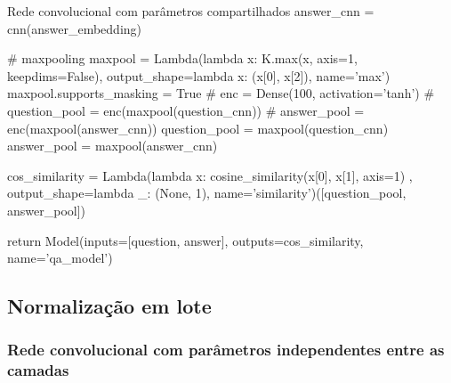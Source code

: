 \begin{mypython-linenumber}{Rede convolucional com parâmetros compartilhados}
            answer_cnn = cnn(answer_embedding)

        # maxpooling
        maxpool = Lambda(lambda x: K.max(x, axis=1, keepdims=False), output_shape=lambda x: (x[0], x[2]),
                         name='max')
        maxpool.supports_masking = True
        # enc = Dense(100, activation='tanh')
        # question_pool = enc(maxpool(question_cnn))
        # answer_pool = enc(maxpool(answer_cnn))
        question_pool = maxpool(question_cnn)
        answer_pool = maxpool(answer_cnn)

        cos_similarity = Lambda(lambda x: cosine_similarity(x[0], x[1], axis=1)
                                       , output_shape=lambda _: (None, 1), name='similarity')([question_pool,
                                                                                               answer_pool])
        

        return Model(inputs=[question, answer], outputs=cos_similarity,
                                   name='qa_model')
\end{mypython-linenumber}

\vspace{2cm}
\subsection{Normalização em lote}

\subsubsection{Rede convolucional com parâmetros independentes entre as camadas}

